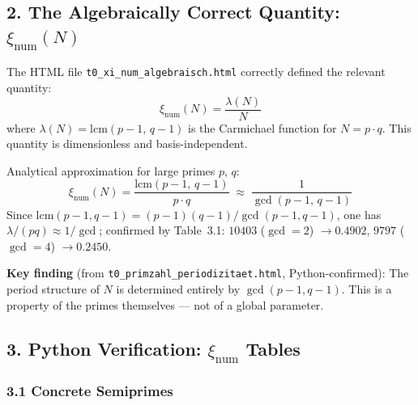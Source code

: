 \subsection*{2. The Algebraically Correct Quantity: $\xi_\text{num}(N)$}

The HTML file \texttt{t0\_xi\_num\_algebraisch.html} correctly defined the
relevant quantity:
\[
\xi_\text{num}(N) = \frac{\lambda(N)}{N}
\]
where $\lambda(N) = \text{lcm}(p-1,\, q-1)$ is the Carmichael function for
$N = p \cdot q$. This quantity is dimensionless and basis-independent.

Analytical approximation for large primes $p$, $q$:
\[
\xi_\text{num}(N) = \frac{\text{lcm}(p-1,\, q-1)}{p \cdot q}
\;\approx\; \frac{1}{\gcd(p-1,\, q-1)}
\]
Since $\text{lcm}(p-1,q-1) = (p-1)(q-1)/\gcd(p-1,q-1)$, one has $\lambda/(pq) \approx 1/\gcd$;
confirmed by Table~3.1: $10403$ ($\gcd = 2$) $\to 0.4902$, $9797$ ($\gcd = 4$) $\to 0.2450$.

\begin{mdframed}[style=ok]
\textbf{Key finding} (from \texttt{t0\_primzahl\_periodizitaet.html},
Python-confirmed): The period structure of $N$ is determined entirely by
$\gcd(p-1, q-1)$. This is a property of the primes themselves —
not of a global parameter.
\end{mdframed}

\subsection*{3. Python Verification: $\xi_\text{num}$ Tables}

\subsubsection*{3.1 Concrete Semiprimes}

\begin{center}
\end{center}


